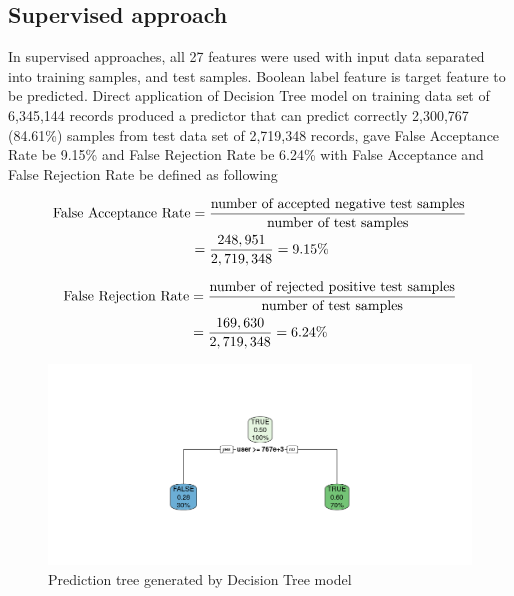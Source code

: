 \documentclass[English]{dicomopapers}
\begin{document}
\subsection{Supervised approach}
 In supervised approaches, all 27 features were used with input data separated into training samples, and test samples. Boolean label feature is target feature to be predicted.\newline
Direct application of Decision Tree model on training data set of 6,345,144 records produced a predictor that can predict correctly 2,300,767 (84.61\%) samples from test data set of 2,719,348 records, gave False Acceptance Rate be 9.15\% and False Rejection Rate be 6.24\% with False Acceptance and False Rejection Rate be defined as following
\begin{center}
  \begin{equation}
    \notag
    \begin{aligned}
      \text{False Acceptance Rate} &= \frac{\text{number of accepted negative test samples}}{\text{number of test samples}} \\
      &= \frac{248,951}{2,719,348}=9.15\%
    \end{aligned}
  \end{equation}
\end{center}
\begin{center}
  \begin{equation}
    \notag
    \begin{aligned}
      \text{False Rejection Rate} &= \frac{\text{number of rejected positive test samples}}{\text{number of test samples}} \\
      &= \frac{169,630}{2,719,348}=6.24\%
    \end{aligned}
  \end{equation}
\end{center}
\begin{figure}[ht]
  \vspace*{-2cm}
  \centering
  \includegraphics[width=\columnwidth,natwidth=1024,natheight=485]{dtree.png}
  \caption{Prediction tree generated by Decision Tree model}\label{fig:dtree}
\end{figure}
\end{document}
